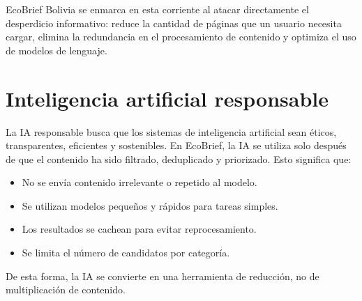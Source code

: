EcoBrief Bolivia se enmarca en esta corriente al atacar directamente el desperdicio informativo: reduce la cantidad de p\'aginas que un usuario necesita cargar, elimina la redundancia en el procesamiento de contenido y optimiza el uso de modelos de lenguaje.

\section{Inteligencia artificial responsable}

La IA responsable busca que los sistemas de inteligencia artificial sean \'eticos, transparentes, eficientes y sostenibles. En EcoBrief, la IA se utiliza solo despu\'es de que el contenido ha sido filtrado, deduplicado y priorizado. Esto significa que:

\begin{itemize}[nosep]
    \item No se env\'ia contenido irrelevante o repetido al modelo.
    \item Se utilizan modelos peque\~nos y r\'apidos para tareas simples.
    \item Los resultados se cachean para evitar reprocesamiento.
    \item Se limita el n\'umero de candidatos por categor\'ia.
\end{itemize}

De esta forma, la IA se convierte en una herramienta de reducci\'on, no de multiplicaci\'on de contenido.
